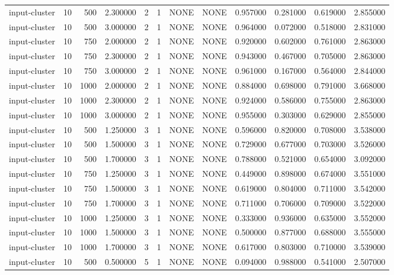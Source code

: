 \begin{tabular}{lrrrllllrrrr}
input-cluster & 10 & 500 & 2.300000 & 2 & 1 & NONE & NONE & 0.957000 & 0.281000 & 0.619000 & 2.855000 \\
input-cluster & 10 & 500 & 3.000000 & 2 & 1 & NONE & NONE & 0.964000 & 0.072000 & 0.518000 & 2.831000 \\
input-cluster & 10 & 750 & 2.000000 & 2 & 1 & NONE & NONE & 0.920000 & 0.602000 & 0.761000 & 2.863000 \\
input-cluster & 10 & 750 & 2.300000 & 2 & 1 & NONE & NONE & 0.943000 & 0.467000 & 0.705000 & 2.863000 \\
input-cluster & 10 & 750 & 3.000000 & 2 & 1 & NONE & NONE & 0.961000 & 0.167000 & 0.564000 & 2.844000 \\
input-cluster & 10 & 1000 & 2.000000 & 2 & 1 & NONE & NONE & 0.884000 & 0.698000 & 0.791000 & 3.668000 \\
input-cluster & 10 & 1000 & 2.300000 & 2 & 1 & NONE & NONE & 0.924000 & 0.586000 & 0.755000 & 2.863000 \\
input-cluster & 10 & 1000 & 3.000000 & 2 & 1 & NONE & NONE & 0.955000 & 0.303000 & 0.629000 & 2.855000 \\
input-cluster & 10 & 500 & 1.250000 & 3 & 1 & NONE & NONE & 0.596000 & 0.820000 & 0.708000 & 3.538000 \\
input-cluster & 10 & 500 & 1.500000 & 3 & 1 & NONE & NONE & 0.729000 & 0.677000 & 0.703000 & 3.526000 \\
input-cluster & 10 & 500 & 1.700000 & 3 & 1 & NONE & NONE & 0.788000 & 0.521000 & 0.654000 & 3.092000 \\
input-cluster & 10 & 750 & 1.250000 & 3 & 1 & NONE & NONE & 0.449000 & 0.898000 & 0.674000 & 3.551000 \\
input-cluster & 10 & 750 & 1.500000 & 3 & 1 & NONE & NONE & 0.619000 & 0.804000 & 0.711000 & 3.542000 \\
input-cluster & 10 & 750 & 1.700000 & 3 & 1 & NONE & NONE & 0.711000 & 0.706000 & 0.709000 & 3.522000 \\
input-cluster & 10 & 1000 & 1.250000 & 3 & 1 & NONE & NONE & 0.333000 & 0.936000 & 0.635000 & 3.552000 \\
input-cluster & 10 & 1000 & 1.500000 & 3 & 1 & NONE & NONE & 0.500000 & 0.877000 & 0.688000 & 3.555000 \\
input-cluster & 10 & 1000 & 1.700000 & 3 & 1 & NONE & NONE & 0.617000 & 0.803000 & 0.710000 & 3.539000 \\
input-cluster & 10 & 500 & 0.500000 & 5 & 1 & NONE & NONE & 0.094000 & 0.988000 & 0.541000 & 2.507000 \\

\end{tabular}
